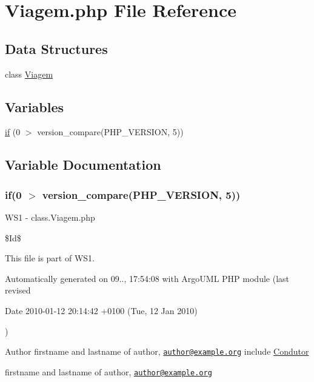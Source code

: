 \hypertarget{_viagem_8php}{}\section{Viagem.\+php File Reference}
\label{_viagem_8php}
\subsection*{Data Structures}
\begin{DoxyCompactItemize}
\item 
class \hyperlink{class_viagem}{Viagem}
\end{DoxyCompactItemize}
\subsection*{Variables}
\begin{DoxyCompactItemize}
\item 
\hyperlink{_viagem_8php_a88cb244e17cabaf4dee5fb3acb8168e0}{if} (0 $>$ version\+\_\+compare(P\+H\+P\+\_\+\+V\+E\+R\+S\+I\+O\+N, \textquotesingle{}5\textquotesingle{}))
\end{DoxyCompactItemize}


\subsection{Variable Documentation}
\hypertarget{_viagem_8php_a88cb244e17cabaf4dee5fb3acb8168e0}{}
\subsubsection[{if}]{\setlength{\rightskip}{0pt plus 5cm}if(0 $>$ version\+\_\+compare(P\+H\+P\+\_\+\+V\+E\+R\+S\+I\+O\+N, \textquotesingle{}5\textquotesingle{}))}\label{_viagem_8php_a88cb244e17cabaf4dee5fb3acb8168e0}
W\+S1 -\/ class.\+Viagem.\+php

\$\+Id\$

This file is part of W\+S1.

Automatically generated on 09.., 17\+:54\+:08 with Argo\+U\+M\+L P\+H\+P module (last revised \begin{DoxyParagraph}{Date}
2010-\/01-\/12 20\+:14\+:42 +0100 (Tue, 12 Jan 2010) 
\end{DoxyParagraph}
)

\begin{DoxyAuthor}{Author}
firstname and lastname of author, \href{mailto:author@example.org}{\tt author@example.\+org} include \hyperlink{class_condutor}{Condutor}

firstname and lastname of author, \href{mailto:author@example.org}{\tt author@example.\+org} 
\end{DoxyAuthor}
